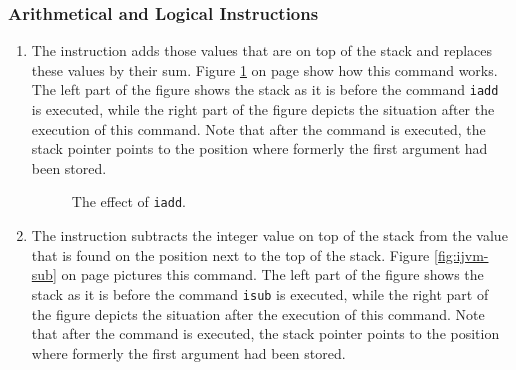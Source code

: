\subsubsection{Arithmetical and Logical Instructions}

\begin{enumerate}
\item The instruction 
      adds those values that are on top of the stack and replaces these values by their sum.
      Figure \ref{fig:ijvm-add} on page \pageref{fig:ijvm-add} show how this command works.
      The left part of the figure shows the stack as it is before the command \texttt{iadd} is executed,
      while the right part of the figure depicts the situation after the execution of this command.  Note
      that after the command is executed, the stack pointer points to the position where formerly the
      first argument had been stored.

\setlength{\unitlength}{0.5cm}
\begin{figure}[!ht]
  \centering
{}
  \caption{The effect of \texttt{iadd}.}
  \label{fig:ijvm-add}
\end{figure}

\item The instruction 
      subtracts the integer value on top of the stack from the value that is found on the position next to
      the top of the stack.
      Figure \ref{fig:ijvm-sub} on page \pageref{fig:ijvm-sub} pictures this command.
      The left part of the figure shows the stack as it is before the command \texttt{isub} is executed,
      while the right part of the figure depicts the situation after the execution of this command.  Note
      that after the command is executed, the stack pointer points to the position where formerly the
      first argument had been stored.


\end{enumerate}
